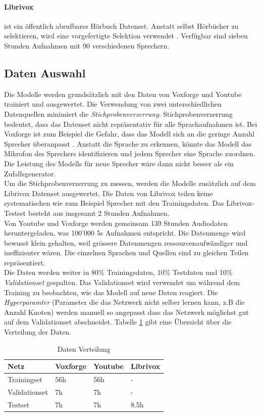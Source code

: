 \paragraph{Librivox} ist ein öffentlich abrufbares Hörbuch Datenset. Anstatt selbst Hörbücher zu selektieren, wird eine vorgefertigte Selektion verwendet \cite{librivox-compilation}. Verfügbar sind sieben Stunden Aufnahmen mit 90 verschiedenen Sprechern.


\subsection{Daten Auswahl}
Die Modelle werden grundsätzlich mit den Daten von Voxforge und Youtube trainiert und ausgewertet. Die Verwendung von zwei unterschiedlichen Datenquellen minimiert die \textit{Stichprobenverzerrung}. Stichprobenverzerrung bedeutet, dass das Datenset nicht repräsentativ für alle Sprachaufnahmen ist. Bei Voxforge ist zum Beispiel die Gefahr, dass das Modell sich an die geringe Anzahl Sprecher überanpasst . Anstatt die Sprache zu erkennen, könnte das Modell das Mikrofon des Sprechers identifizieren und jedem Sprecher eine Sprache zuordnen. Die Leistung des Modells für neue Sprecher wäre dann nicht besser als ein Zufallsgenerator.
\\
Um die Stichprobenverzerrung zu messen, werden die Modelle zusätzlich auf dem Librivox Datenset ausgewertet. Die Daten von Librivox teilen keine systematischen  wie zum Beispiel Sprecher mit den Trainingsdaten. Das Librivox-Testset besteht aus insgesamt 2 Stunden Aufnahmen.
\\
Von Youtube und Voxforge werden gemeinsam 139 Stunden Audiodaten heruntergeladen, was 100'000 5s Aufnahmen entspricht. Die Datenmenge wird bewusst klein gehalten, weil grössere Datenmengen ressourcenaufwändiger und ineffizienter wären. Die einzelnen Sprachen und Quellen sind zu gleichen Teilen repräsentiert. 
\\
Die Daten werden weiter in 80\% Trainingsdaten, 10\% Testdaten und 10\% \textit{Validationset} gespalten. Das Validationset wird verwendet um während dem Training zu beobachten, wie das Modell auf neue Daten reagiert. Die \textit{Hyperparamter} (Parameter die das Netzwerk nicht selber lernen kann, z.B die Anzahl Knoten) werden manuell so angepasst dass das Netzwerk möglichst gut auf dem Validationset abschneidet. Tabelle \ref{tab:data} gibt eine Übersicht über die Verteilung der Daten.
\begin{table}[]
	\centering
	\begin{tabular}{llll}
	\hline
	Netz          & Voxforge & Youtube & Librivox \\ \hline
	Trainingset   & 56h      & 56h     & -        \\
	Validationset & 7h       & 7h      & -        \\
	Testset       & 7h       & 7h      & 8.5h       \\ \hline
	\end{tabular}
	\caption{Daten Verteilung}
	\label{tab:data}
\end{table}


